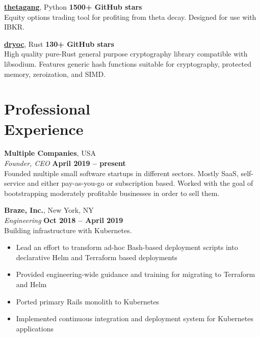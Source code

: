 \documentclass[margin,line]{resume}
\begin{document}
\begin{resume}
    \href{https://github.com/brndnmtthws/thetagang}{\textbf{thetagang}}, Python \hfill \textbf{1500+ GitHub stars}\\
    Equity options trading tool for profiting from theta decay. Designed for use
    with IBKR.

    \href{https://github.com/brndnmtthws/dryoc}{\textbf{dryoc}}, Rust \hfill \textbf{130+ GitHub stars}\\
    High quality pure-Rust general purpose cryptography library compatible with
    libsodium.  Features generic hash functions suitable for cryptography,
    protected memory, zeroization, and SIMD.

    \vspace{3mm}

    \section{\mysidestyle Professional\\Experience}

    \textbf{Multiple Companies}, USA \vspace{2mm}\\\vspace{1mm}%
    \textsl{Founder, CEO} \hfill \textbf{April 2019 -- present}\\
    Founded multiple small software startups in different sectors. Mostly SaaS,
    self-service and either pay-as-you-go or subscription based. Worked with the
    goal of bootstrapping moderately profitable businesses in order to sell
    them.

    \textbf{Braze, Inc.}, New York, NY \vspace{2mm}\\\vspace{1mm}%
    \textsl{Engineering} \hfill \textbf{Oct 2018 -- April 2019}\\
    Building infrastructure with Kubernetes.
    
    \begin{itemize}
        \item Lead an effort to transform ad-hoc Bash-based deployment scripts
        into declarative Helm and Terraform based deployments
        \item Provided engineering-wide guidance and training for migrating to
        Terraform and Helm
        \item Ported primary Rails monolith to Kubernetes
        \item Implemented continuous integration and deployment system for
        Kubernetes applications
    \end{itemize}


\end{resume}
\end{document}
